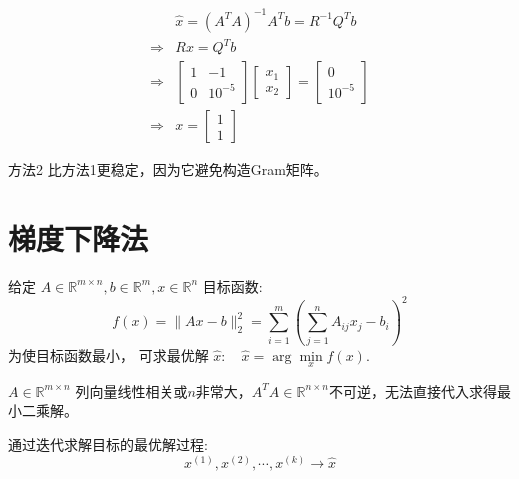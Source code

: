 \begin{example}
\begin{equation}\begin{aligned}
    &\hat{x}=\left(A^{T} A\right)^{-1} A^{T} b=R^{-1} Q^{T} b \\
    \Rightarrow& R x=Q^{T} b\\
    \Rightarrow& \left[\begin{array}{cc}1 & -1 \\ 0 & 10^{-5}\end{array}\right]\left[\begin{array}{l}x_{1} \\ x_{2}\end{array}\right]=\left[\begin{array}{l}0 \\ 10^{-5}\end{array}\right] \\
    \Rightarrow& x=\left[\begin{array}{l}1 \\ 1\end{array}\right]
\end{aligned}\end{equation}

\end{example}

方法2 比方法1更稳定，因为它避免构造Gram矩阵。



\section{梯度下降法}

给定 $ A \in \mathbb{R}^{m \times n}, {b} \in \mathbb{R}^{m}, x \in \mathbb{R}^{n} $ 目标函数:
\begin{equation}
f(x)=\|A x-b\|_{2}^{2}=\sum_{i=1}^{m}\left(\sum_{j=1}^{n} A_{i j} x_{j}-b_{i}\right)^{2}
\end{equation}
为使目标函数最小， 可求最优解 $ \hat{x}: \quad \hat{x}=\arg \underset{x}{ \min } f(x) $.

\begin{problem}
    $ A \in \mathbb{R}^{{m} \times n} $ 列向量线性相关或$n$非常大，$
    A^{T} A \in \mathbb{R}^{n \times n}$不可逆，无法直接代入求得最小二乘解。
\end{problem}

通过迭代求解目标的最优解过程: \begin{equation} x^{(1)}, x^{(2)}, \cdots, x^{(k)} \rightarrow \hat{x} \end{equation} 

